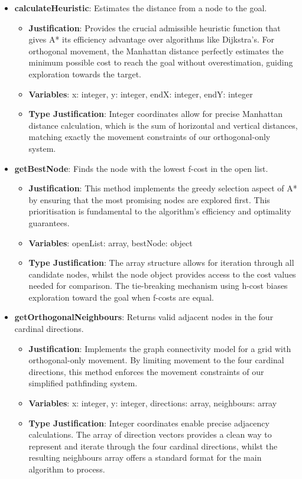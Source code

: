 \begin{itemize}
\item \textbf{calculateHeuristic}: Estimates the distance from a node to the goal. \begin{itemize} \item \textbf{Justification}: Provides the crucial admissible heuristic function that gives A* its efficiency advantage over algorithms like Dijkstra's. For orthogonal movement, the Manhattan distance perfectly estimates the minimum possible cost to reach the goal without overestimation, guiding exploration towards the target. \item \textbf{Variables}: x: integer, y: integer, endX: integer, endY: integer \item \textbf{Type Justification}: Integer coordinates allow for precise Manhattan distance calculation, which is the sum of horizontal and vertical distances, matching exactly the movement constraints of our orthogonal-only system. \end{itemize}

\item \textbf{getBestNode}: Finds the node with the lowest f-cost in the open list. \begin{itemize} \item \textbf{Justification}: This method implements the greedy selection aspect of A* by ensuring that the most promising nodes are explored first. This prioritisation is fundamental to the algorithm's efficiency and optimality guarantees. \item \textbf{Variables}: openList: array, bestNode: object \item \textbf{Type Justification}: The array structure allows for iteration through all candidate nodes, whilst the node object provides access to the cost values needed for comparison. The tie-breaking mechanism using h-cost biases exploration toward the goal when f-costs are equal. \end{itemize}

\item \textbf{getOrthogonalNeighbours}: Returns valid adjacent nodes in the four cardinal directions. \begin{itemize} \item \textbf{Justification}: Implements the graph connectivity model for a grid with orthogonal-only movement. By limiting movement to the four cardinal directions, this method enforces the movement constraints of our simplified pathfinding system. \item \textbf{Variables}: x: integer, y: integer, directions: array, neighbours: array \item \textbf{Type Justification}: Integer coordinates enable precise adjacency calculations. The array of direction vectors provides a clean way to represent and iterate through the four cardinal directions, whilst the resulting neighbours array offers a standard format for the main algorithm to process. \end{itemize}


\end{itemize}
